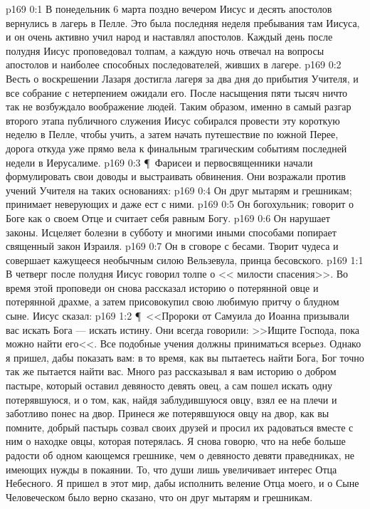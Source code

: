 \vs p169 0:1 В понедельник 6 марта поздно вечером Иисус и десять апостолов вернулись в лагерь в Пелле. Это была последняя неделя пребывания там Иисуса, и он очень активно учил народ и наставлял апостолов. Каждый день после полудня Иисус проповедовал толпам, а каждую ночь отвечал на вопросы апостолов и наиболее способных последователей, живших в лагере.
\vs p169 0:2 Весть о воскрешении Лазаря достигла лагеря за два дня до прибытия Учителя, и все собрание с нетерпением ожидали его. После насыщения пяти тысяч ничто так не возбуждало воображение людей. Таким образом, именно в самый разгар второго этапа публичного служения Иисус собирался провести эту короткую неделю в Пелле, чтобы учить, а затем начать путешествие по южной Перее, дорога откуда уже прямо вела к финальным трагическим событиям последней недели в Иерусалиме.
\vs p169 0:3 \P\ Фарисеи и первосвященники начали формулировать свои доводы и выстраивать обвинения. Они возражали против учений Учителя на таких основаниях:
\vs p169 0:4 \bibnobreakspace Он друг мытарям и грешникам; принимает неверующих и даже ест с ними.
\vs p169 0:5 \bibnobreakspace Он богохульник; говорит о Боге как о своем Отце и считает себя равным Богу.
\vs p169 0:6 \bibnobreakspace Он нарушает законы. Исцеляет болезни в субботу и многими иными способами попирает священный закон Израиля.
\vs p169 0:7 \bibnobreakspace Он в сговоре с бесами. Творит чудеса и совершает кажущееся необычным силою Вельзевула, принца бесовского.
\vs p169 1:1 В четверг после полудня Иисус говорил толпе о << милости спасения>>. Во время этой проповеди он снова рассказал историю о потерянной овце и потерянной драхме, а затем присовокупил свою любимую притчу о блудном сыне. Иисус сказал:
\vs p169 1:2 \P\ <<Пророки от Самуила до Иоанна призывали вас искать Бога --- искать истину. Они всегда говорили: >>Ищите Господа, пока можно найти его<<. Все подобные учения должны приниматься всерьез. Однако я пришел, дабы показать вам: в то время, как вы пытаетесь найти Бога, Бог точно так же пытается найти вас. Много раз рассказывал я вам историю о добром пастыре, который оставил девяносто девять овец, а сам пошел искать одну потерявшуюся, и о том, как, найдя заблудившуюся овцу, взял ее на плечи и заботливо понес на двор. Принеся же потерявшуюся овцу на двор, как вы помните, добрый пастырь созвал своих друзей и просил их радоваться вместе с ним о находке овцы, которая потерялась. Я снова говорю, что на небе больше радости об одном кающемся грешнике, чем о девяносто девяти праведниках, не имеющих нужды в покаянии. То, что души  лишь увеличивает интерес Отца Небесного. Я пришел в этот мир, дабы исполнить веление Отца моего, и о Сыне Человеческом было верно сказано, что он друг мытарям и грешникам.

